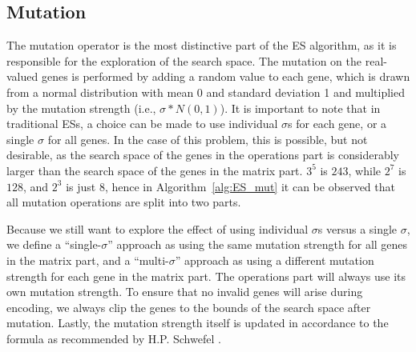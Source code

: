 \documentclass{article}
\begin{document}
\vspace{-0.5cm}
\subsection{Mutation}
\label{sec:ES_mut}
\vspace{-0.2cm}
The mutation operator is the most distinctive part of the ES algorithm, as it is responsible for the exploration of the search space.
The mutation on the real-valued genes is performed by adding a random value to each gene, which is drawn from a normal distribution with mean 0 and standard deviation 1 and multiplied by the mutation strength (i.e., $\sigma * N(0, 1)$).
It is important to note that in traditional ESs, a choice can be made to use individual $\sigma$s for each gene, or a single $\sigma$ for all genes.
In the case of this problem, this is possible, but not desirable, as the search space of the genes in the operations part is considerably larger than the search space of the genes in the matrix part.
$3^5$ is $243$, while $2^7$ is $128$, and $2^3$ is just $8$, hence in Algorithm~\ref{alg:ES_mut} it can be observed that all mutation operations are split into two parts.

Because we still want to explore the effect of using individual $\sigma$s versus a single $\sigma$, we define a ``single-$\sigma$'' approach as using the same mutation strength for all genes in the matrix part, and a ``multi-$\sigma$'' approach as using a different mutation strength for each gene in the matrix part.
The operations part will always use its own mutation strength.
To ensure that no invalid genes will arise during encoding, we always clip the genes to the bounds of the search space after mutation.
Lastly, the mutation strength itself is updated in accordance to the formula as recommended by H.P. Schwefel \cite{tau}.
\end{document}

